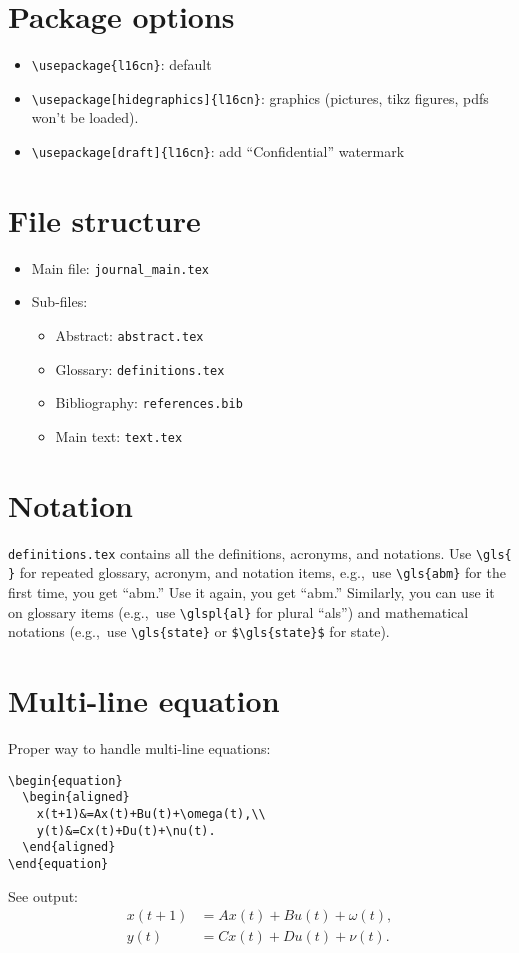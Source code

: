
\section{Package options}
\begin{itemize}
	\item \verb|\usepackage{l16cn}|: default
	\item \verb|\usepackage[hidegraphics]{l16cn}|: graphics 
	(pictures, tikz figures, pdfs won't be loaded).
	\item \verb|\usepackage[draft]{l16cn}|: add ``Confidential'' watermark
\end{itemize}

\section{File structure}
\begin{itemize}
	\item Main file: \verb|journal_main.tex|
	\item Sub-files:
	\begin{itemize}
		\item Abstract: \verb|abstract.tex|
		\item Glossary: \verb|definitions.tex|
		\item Bibliography: \verb|references.bib|
		\item Main text: \verb|text.tex|
	\end{itemize}
\end{itemize}

\section{Notation}
\verb|definitions.tex| contains all the 
definitions, acronyms, and notations.
Use \verb|\gls{ }| for
repeated glossary, acronym, and notation items, 
e.g.,~use \verb|\gls{abm}| for the first time,
you get ``\gls{abm}.'' Use it again, you get ``\gls{abm}.''
Similarly, you can use it on glossary items 
(e.g.,~use \verb|\glspl{al}| for plural ``\glspl{al}'')
and mathematical notations 
(e.g.,~use \verb|\gls{state}| or \verb|$\gls{state}$|
for \gls{state}).

\section{Multi-line equation}
Proper way to handle multi-line equations:
\begin{verbatim}
\begin{equation}
  \begin{aligned}
    x(t+1)&=Ax(t)+Bu(t)+\omega(t),\\
    y(t)&=Cx(t)+Du(t)+\nu(t).
  \end{aligned}
\end{equation}
\end{verbatim}
See output:
\begin{equation}
  \begin{aligned}
    x(t+1)&=Ax(t)+Bu(t)+\omega(t),\\
    y(t)&=Cx(t)+Du(t)+\nu(t).
  \end{aligned}
\end{equation}

